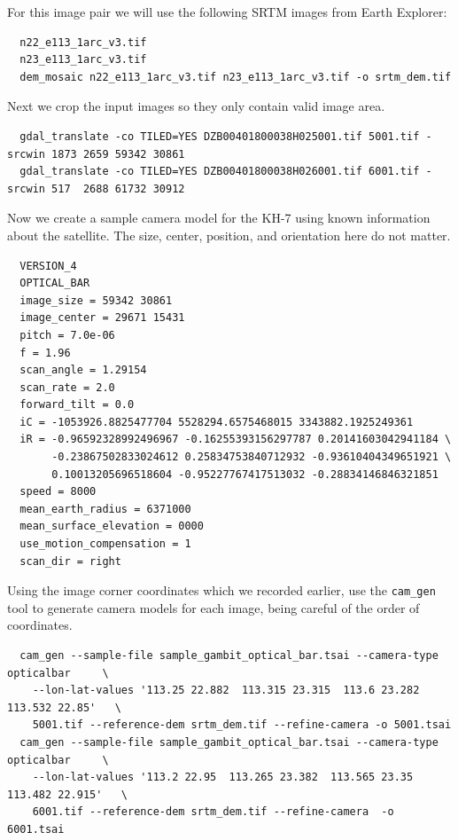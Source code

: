 For this image pair we will use the following SRTM images from Earth Explorer:

\begin{verbatim}
  n22_e113_1arc_v3.tif
  n23_e113_1arc_v3.tif
  dem_mosaic n22_e113_1arc_v3.tif n23_e113_1arc_v3.tif -o srtm_dem.tif
\end{verbatim}

Next we crop the input images so they only contain valid image area.

\begin{verbatim}
  gdal_translate -co TILED=YES DZB00401800038H025001.tif 5001.tif -srcwin 1873 2659 59342 30861
  gdal_translate -co TILED=YES DZB00401800038H026001.tif 6001.tif -srcwin 517  2688 61732 30912
\end{verbatim}

Now we create a sample camera model for the KH-7 using known information about the satellite.
The size, center, position, and orientation here do not matter.

\begin{verbatim}
  VERSION_4
  OPTICAL_BAR
  image_size = 59342 30861
  image_center = 29671 15431
  pitch = 7.0e-06
  f = 1.96
  scan_angle = 1.29154
  scan_rate = 2.0
  forward_tilt = 0.0
  iC = -1053926.8825477704 5528294.6575468015 3343882.1925249361
  iR = -0.96592328992496967 -0.16255393156297787 0.20141603042941184 \
       -0.23867502833024612 0.25834753840712932 -0.93610404349651921 \
       0.10013205696518604 -0.95227767417513032 -0.28834146846321851
  speed = 8000
  mean_earth_radius = 6371000
  mean_surface_elevation = 0000
  use_motion_compensation = 1
  scan_dir = right
\end{verbatim}

Using the image corner coordinates which we recorded earlier, use the \texttt{cam\_gen}
tool to generate camera models for each image, being careful of the order of coordinates.

\begin{verbatim}
  cam_gen --sample-file sample_gambit_optical_bar.tsai --camera-type opticalbar     \
    --lon-lat-values '113.25 22.882  113.315 23.315  113.6 23.282  113.532 22.85'   \
    5001.tif --reference-dem srtm_dem.tif --refine-camera -o 5001.tsai
  cam_gen --sample-file sample_gambit_optical_bar.tsai --camera-type opticalbar     \
    --lon-lat-values '113.2 22.95  113.265 23.382  113.565 23.35  113.482 22.915'   \
    6001.tif --reference-dem srtm_dem.tif --refine-camera  -o 6001.tsai
\end{verbatim}


